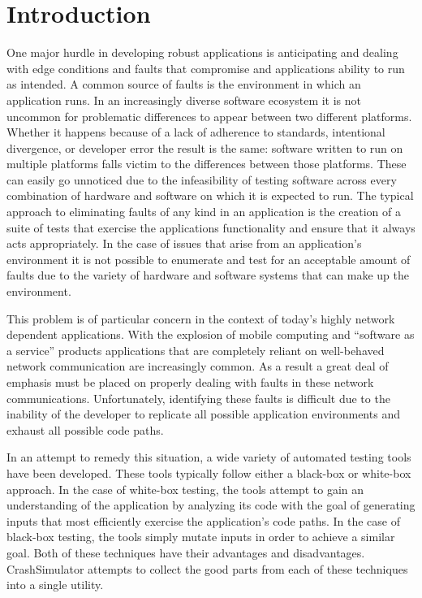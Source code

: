 \section{Introduction}

    One major hurdle in developing robust applications is anticipating and dealing with edge conditions and faults that
    compromise and applications ability to run as intended. A common source of faults is the environment in which an
    application runs. In an increasingly diverse software ecosystem it is not uncommon for problematic differences to
    appear between two different platforms. Whether it happens because of a lack of adherence to standards, intentional
    divergence, or developer error the result is the same: software written to run on multiple platforms falls victim to
    the differences between those platforms. These can easily go unnoticed due to the infeasibility of testing software
    across every combination of hardware and software on which it is expected to run. The typical approach to
    eliminating faults of any kind in an application is the creation of a suite of tests that exercise the applications
    functionality and ensure that it always acts appropriately. In the case of issues that arise from an application's
    environment it is not possible to enumerate and test for an acceptable amount of faults due to the variety of
    hardware and software systems that can make up the environment.

    This problem is of particular concern in the context of today's highly network dependent applications. With the
    explosion of mobile computing and ``software as a service'' products applications that are completely reliant on
    well-behaved network communication are increasingly common. As a result a great deal of emphasis must be placed on
    properly dealing with faults in these network communications. Unfortunately, identifying these faults is difficult
    due to the inability of the developer to replicate all possible application environments and exhaust all possible
    code paths.

    In an attempt to remedy this situation, a wide variety of automated testing tools have been developed. These tools
    typically follow either a black-box or white-box approach. In the case of white-box testing, the tools attempt to
    gain an understanding of the application by analyzing its code with the goal of generating inputs that most
    efficiently exercise the application's code paths. In the case of black-box testing, the tools simply mutate inputs
    in order to achieve a similar goal. Both of these techniques have their advantages and disadvantages. CrashSimulator
    attempts to collect the good parts from each of these techniques into a single utility.

